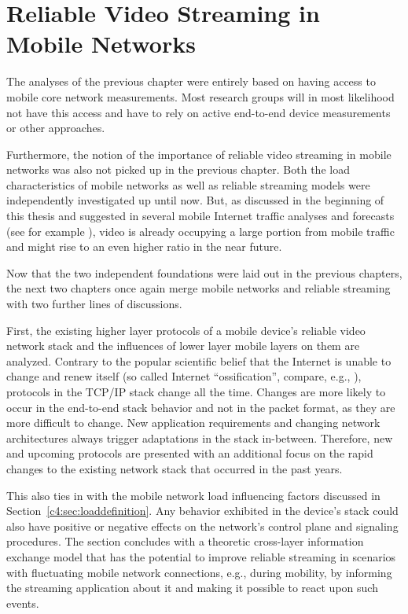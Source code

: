 \chapter{Reliable Video Streaming in Mobile Networks}
\label{chap:mobilestreaming}

The analyses of the previous chapter were entirely based on having access to mobile core network measurements. Most research groups will in most likelihood not have this access and have to rely on active end-to-end device measurements or other approaches.

Furthermore, the notion of the importance of reliable video streaming in mobile networks was also not picked up in the previous chapter. Both the load characteristics of mobile networks as well as reliable streaming models were independently investigated up until now. But, as discussed in the beginning of this thesis and suggested in several mobile Internet traffic analyses and forecasts (see for example \cite{cisco2014VNI}), video is already occupying a large portion from mobile traffic and might rise to an even higher ratio in the near future.

Now that the two independent foundations were laid out in the previous chapters, the next two chapters once again merge mobile networks and reliable streaming with two further lines of discussions. 

First, the existing higher layer protocols of a mobile device's reliable video network stack and the influences of lower layer mobile layers on them are analyzed. Contrary to the popular scientific belief that the Internet is unable to change and renew itself (so called Internet ``ossification'', compare, e.g., \cite{feldmann2010ossification}), protocols in the \gls{TCP}/\gls{IP} stack change all the time. Changes are more likely to occur in the end-to-end stack behavior and not in the packet format, as they are more difficult to change. New application requirements and changing network architectures always trigger adaptations in the stack in-between. Therefore, new and upcoming protocols are presented with an additional focus on the rapid changes to the existing network stack that occurred in the past years.

This also ties in with the mobile network load influencing factors discussed in Section~\ref{c4:sec:loaddefinition}. Any behavior exhibited in the device's stack could also have positive or negative effects on the network's control plane and signaling procedures. The section concludes with a theoretic cross-layer information exchange model that has the potential to improve reliable streaming in scenarios with fluctuating mobile network connections, e.g., during mobility, by informing the streaming application about it and making it possible to react upon such events.

